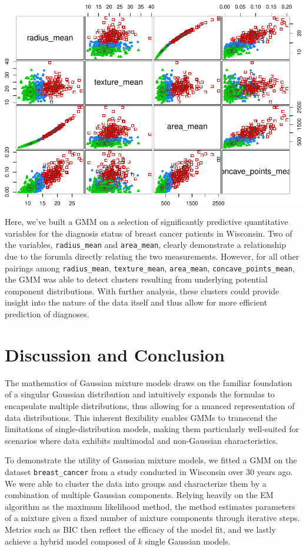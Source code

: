 \documentclass[12pt]{article}
\begin{document}
\includegraphics{CassieJinPaper_files/figure-latex/unnamed-chunk-11-1.pdf}

Here, we've built a GMM on a selection of significantly predictive
quantitative variables for the diagnosis status of breast cancer
patients in Wisconsin. Two of the variables, \texttt{radius\_mean} and
\texttt{area\_mean}, clearly demonstrate a relationship due to the
forumla directly relating the two measurements. However, for all other
pairings among \texttt{radius\_mean}, \texttt{texture\_mean},
\texttt{area\_mean}, \texttt{concave\_points\_mean}, the GMM was able to
detect clusters resulting from underlying potential component
distributions. With further analysis, these clusters could provide
insight into the nature of the data itself and thus allow for more
efficient prediction of diagnoses.

\hypertarget{discussion-and-conclusion}{%
\section{Discussion and Conclusion}\label{discussion-and-conclusion}}

The mathematics of Gaussian mixture models draws on the familiar
foundation of a singular Gaussian distribution and intuitively expands
the formulas to encapsulate multiple distributions, thus allowing for a
nuanced representation of data distributions. This inherent flexibility
enables GMMs to transcend the limitations of single-distribution models,
making them particularly well-suited for scenarios where data exhibits
multimodal and non-Gaussian characteristics.

To demonstrate the utility of Gaussian mixture models, we fitted a GMM
on the dataset \texttt{breast\_cancer} from a study conducted in
Wisconsin over 30 years ago. We were able to cluster the data into
groups and characterize them by a combination of multiple Gaussian
components. Relying heavily on the EM algorithm as the maximum
likelihood method, the method estimates parameters of a mixture given a
fixed number of mixture components through iterative steps. Metrics such
as BIC then reflect the efficacy of the model fit, and we lastly achieve
a hybrid model composed of \(k\) single Gaussian models.
\end{document}
